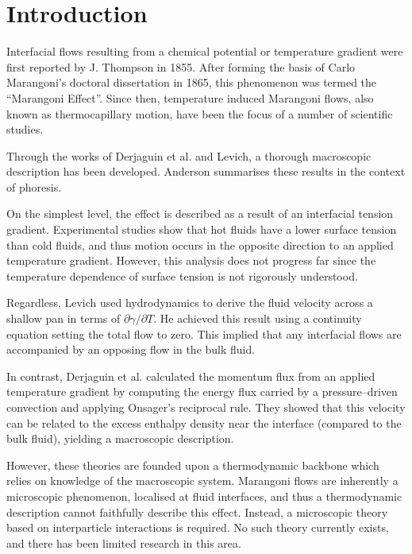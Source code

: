 \section{Introduction}
Interfacial flows resulting from a chemical potential or temperature gradient were first reported by J. Thompson in 1855.\cite{JThompson}
After forming the basis of Carlo Marangoni's doctoral dissertation in 1865, this phenomenon was termed the ``Marangoni Effect''.\cite{Marangoni}
Since then, temperature induced Marangoni flows, also known as thermocapillary motion, have been the focus of a number of scientific studies.

Through the works of Derjaguin et al.\cite{SurfaceForces} and Levich\cite{Levich}, a thorough macroscopic description has been developed.
Anderson summarises these results in the context of phoresis.\cite{Anderson}

On the simplest level, the effect is described as a result of an interfacial tension gradient.
Experimental studies show that hot fluids have a lower surface tension than cold fluids,\cite{Ficalbi1972,Kayser1975} and thus motion occurs in the opposite direction to an applied temperature gradient.
However, this analysis does not progress far since the temperature dependence of surface tension is not rigorously understood.

Regardless, Levich used hydrodynamics to derive the fluid velocity across a shallow pan in terms of $\partial \gamma / \partial T$.\cite{Levich}
He achieved this result using a continuity equation setting the total flow to zero.
This implied that any interfacial flows are accompanied by an opposing flow in the bulk fluid.

In contrast, Derjaguin et al. calculated the momentum flux from an applied temperature gradient by computing the energy flux carried by a pressure--driven convection and applying Onsager's reciprocal rule.\cite{SurfaceForces}
They showed that this velocity can be related to the excess enthalpy density near the interface (compared to the bulk fluid), yielding a macroscopic description.

However, these theories are founded upon a thermodynamic backbone which relies on knowledge of the macroscopic system.
Marangoni flows are inherently a microscopic phenomenon, localised at fluid interfaces, and thus a thermodynamic description cannot faithfully describe this effect.
Instead, a microscopic theory based on interparticle interactions is required.
No such theory currently exists, and there has been limited research in this area.\cite{HolgerBoppHampe}

